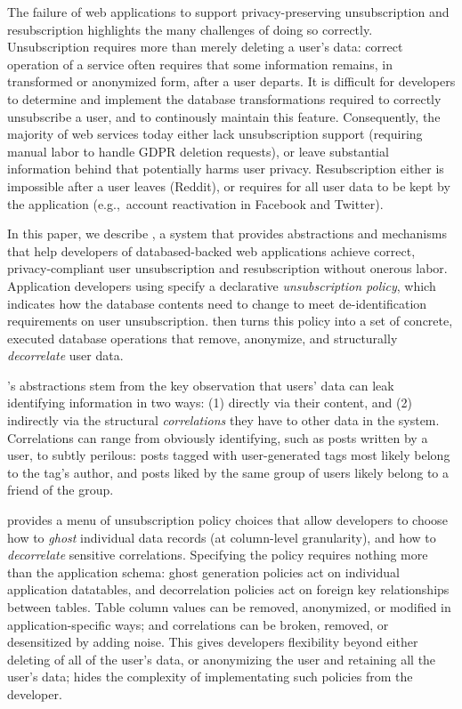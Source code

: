 The failure of web applications to support privacy-preserving unsubscription and resubscription  
highlights the many challenges of doing so correctly.
%
Unsubscription requires more than merely deleting a user's data: correct operation
of a service often requires that some information remains, in transformed or
anonymized form, after a user departs.
%
%
It is difficult for developers to determine and implement the database
transformations required to correctly unsubscribe a user, and to continously
maintain this feature.
%
Consequently, the majority of web services today either lack unsubscription support
(requiring manual labor to handle \eg GDPR deletion requests), or leave substantial
information behind that potentially harms user privacy.
%
Resubscription either is impossible after a user leaves (\eg Reddit), or requires for all user data
to be kept by the application (e.g.,\ account reactivation in Facebook and Twitter).

In this paper, we describe \sys, a system that provides abstractions and mechanisms
that help developers of databased-backed web applications achieve correct,
privacy-compliant user unsubscription and resubscription without onerous labor.
%
Application developers using \sys specify a declarative \emph{unsubscription policy},
which indicates how the database contents need to change to meet de-identification
requirements on user unsubscription.
%
\sys then turns this policy into a set of concrete, executed database operations that remove,
anonymize, and structurally \emph{decorrelate} user data.

\sys's abstractions stem from the key observation that users' data can leak identifying information
in two ways: (1) directly via their content, and (2) indirectly via the structural
\emph{correlations} they have to other data in the system.  Correlations can range from obviously
identifying, such as posts written by a user, to subtly perilous: posts tagged with user-generated
tags most likely belong to the tag's author, and posts liked by the same group of users likely
belong to a friend of the group.

%
\sys provides a menu of unsubscription policy choices 
that allow developers to choose how to \emph{ghost} individual data records
(at column-level granularity), and how to
\emph{decorrelate} sensitive correlations. Specifying the policy requires nothing more than the
application schema: ghost generation policies act on individual application datatables, and
decorrelation policies act on foreign key relationships between tables.
Table column values can be removed, anonymized, or modified in application-specific ways; and
correlations can be broken, removed, or desensitized by adding noise. This gives developers flexibility beyond either deleting of all of
the user's data, or anonymizing the user and retaining all the user's data; \sys hides the
complexity of implementating such policies from the developer.

